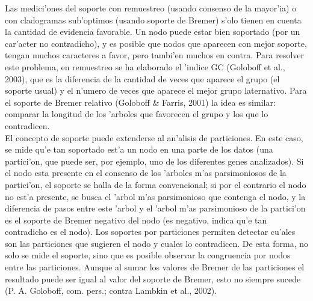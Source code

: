 Las medici'ones del soporte con remuestreo (usando consenso de la mayor'ia) o con cladogramas sub'optimos (usando soporte de Bremer) s'olo tienen en cuenta la cantidad de evidencia favorable. Un nodo puede estar bien soportado (por un car'acter no contradicho), y es posible que nodos que aparecen con mejor soporte, tengan muchos caracteres a favor, pero tambi'en muchos en contra. Para resolver este problema, en remuestreo se ha elaborado el 'indice GC (Goloboff et al., 2003), que es la diferencia de la cantidad de veces que aparece el grupo (el soporte usual) y el n'umero de veces que aparece el mejor grupo laternativo. Para el soporte de Bremer relativo (Goloboff \& Farris, 2001) la idea es similar: comparar la longitud de los 'arboles que favorecen el grupo y los que lo contradicen.\\
El concepto de soporte puede extenderse al an'alisis de particiones. En este caso, se mide qu'e tan soportado est'a un nodo en una parte de los datos (una partici'on, que puede ser, por ejemplo, uno de los diferentes genes analizados). Si el nodo esta presente en el consenso de los 'arboles m'as parsimoniosos de la partici'on, el soporte se halla de la forma convencional; si por el contrario el nodo no est'a presente, se busca el 'arbol m'as parsimonioso que contenga el nodo, y la diferencia de pasos entre este 'arbol y el 'arbol m'as parsimonioso de la partici'on es el soporte de Bremer negativo del nodo (es negativo, indica qu'e tan contradicho es el nodo). Los soportes por particiones permiten detectar cu'ales son las particiones que sugieren el nodo y cuales lo contradicen. De esta forma, no solo se mide el soporte, sino que es posible observar la congruencia por nodos entre las particiones. Aunque al sumar los valores de Bremer de las particiones el resultado puede ser igual al valor del soporte de Bremer, esto no siempre sucede (P. A. Goloboff, com. pers.; contra Lambkin et al., 2002).
